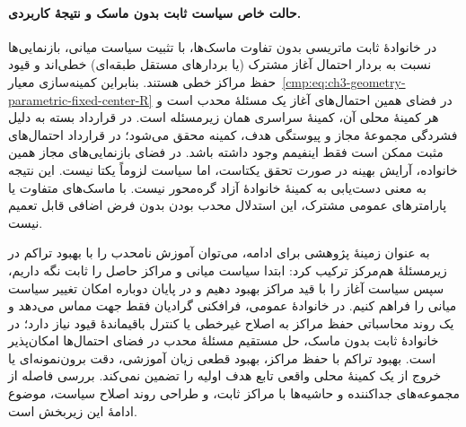 \paragraph{حالت خاص سیاست ثابت بدون ماسک و نتیجهٔ کاربردی.}
در خانوادهٔ ثابت ماتریسی بدون تفاوت ماسک‌ها، با تثبیت سیاست میانی، بازنمایی‌ها نسبت به بردار احتمال آغاز مشترک (یا بردارهای مستقل طبقه‌ای) خطی‌اند و قیود حفظ مراکز خطی هستند. بنابراین کمینه‌سازی معیار~\eqref{cmp:eq:ch3-geometry-parametric-fixed-center-R} در فضای همین احتمال‌های آغاز یک مسئلهٔ محدب است و هر کمینهٔ محلی آن، کمینهٔ سراسری همان زیرمسئله است. در قرارداد بسته به دلیل فشردگی مجموعهٔ مجاز و پیوستگی هدف، کمینه محقق می‌شود؛ در قرارداد احتمال‌های مثبت ممکن است فقط اینفیمم وجود داشته باشد. در فضای بازنمایی‌های مجاز همین خانواده، آرایش بهینه در صورت تحقق یکتاست، اما سیاست لزوماً یکتا نیست. این نتیجه به معنی دست‌یابی به کمینهٔ خانوادهٔ آزاد گره‌محور نیست. با ماسک‌های متفاوت یا پارامترهای عمومی مشترک، این استدلال محدب بودن بدون فرض اضافی قابل تعمیم نیست.

به عنوان زمینهٔ پژوهشی برای ادامه، می‌توان آموزش نامحدب را با بهبود تراکم در زیرمسئلهٔ هم‌مرکز ترکیب کرد: ابتدا سیاست میانی و مراکز حاصل را ثابت نگه داریم، سپس سیاست آغاز را با قید مراکز بهبود دهیم و در پایان دوباره امکان تغییر سیاست میانی را فراهم کنیم. در خانوادهٔ عمومی، فرافکنی گرادیان فقط جهت مماس می‌دهد و یک روند محاسباتی حفظ مراکز به اصلاح غیرخطی یا کنترل باقیماندهٔ قیود نیاز دارد؛ در خانوادهٔ ثابت بدون ماسک، حل مستقیم مسئلهٔ محدب در فضای احتمال‌ها امکان‌پذیر است. بهبود تراکم با حفظ مراکز، بهبود قطعی زیان آموزشی، دقت برون‌نمونه‌ای یا خروج از یک کمینهٔ محلی واقعی تابع هدف اولیه را تضمین نمی‌کند. بررسی فاصله از مجموعه‌های جداکننده و حاشیه‌ها با مراکز ثابت، و طراحی روند اصلاح سیاست، موضوع ادامهٔ این زیربخش است.

